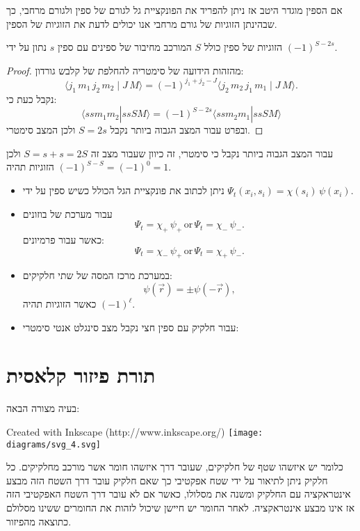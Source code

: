 \documentclass{tstextbook}
\begin{document}
\begin{proposition}
אם הספין מוגדר היטב אז ניתן להפריד את הפונקציית גל לגורם של ספין ולגורם מרחבי, כך שבהינתן הזוגיות של גורם מרחבי אנו יכולים לדעת את הזוגיות של הספין.

\end{proposition}
\begin{proposition}
הזוגיות של ספין כולל \(S\) המורכב מחיבור של ספינים עם ספין \(s\) נתון על ידי \((-1)^{S-2s}\).

\end{proposition}
\begin{proof}
מהזהות הידועה של סימטריה להחלפת של קלבש גורדון:
$$\langle j_{1}\,m_{1}\,j_{2}\,m_{2}\mid J\,M\rangle=(-1)^{j_{1}+j_{2}-J}\langle j_{2}\,m_{2}\,j_{1}\,m_{1}\mid J\,M\rangle.$$
נקבל כעת כי:
$$\langle ssm_{1}m_{2}|ssSM \rangle =(-1)^{S-2s}\langle ssm_{2}m_{1}|ssSM \rangle $$
ובפרט עבור המצב הגבוה ביותר נקבל \(S=2s\) ולכן המצב סימטרי.

\end{proof}
\begin{corollary}
עבור המצב הגבוה ביותר נקבל כי סימטרי, זה כיוון שעבור מצב זה \(S=s+s=2S\) ולכן הזוגיות תהיה \((-1)^{S-S}=(-1)^{0}=1\).

\end{corollary}
\begin{summary}
  \begin{itemize}
    \item ניתן לכתוב את פונקציית הגל הכולל כשיש ספין על ידי \(\Psi_{t}(x_{i},s_{i})=\chi(s_{i})\,\psi(x_{i})\).
    \item עבור מערכת של בוזונים $$\Psi_{t}=\chi_{+}\,\psi_{+}\,\mathrm{or}\,\Psi_{t}=\chi_{-}\,\psi_{-}.$$
כאשר עבור פרמיונים:
$$\Psi_{t}=\chi_{-}\,\psi_{+}\,\mathrm{or}\,\Psi_{t}=\chi_{+}\,\psi_{-}.$$
    \item במערכת מרכז המסה של שתי חלקיקים:
$$\psi({\vec{r}})=\pm\psi(-{\vec{r}}),$$
כאשר הזוגיות תהיה \((-1)^{\ell}\).
    \item עבור חלקיק עם ספין חצי נקבל מצב סינגלט אנטי סימטרי:
  \end{itemize}
\end{summary}

\section{תורת פיזור קלאסית}

\begin{definition}
בעיה מצורה הבאה:

 Created with Inkscape (http://www.inkscape.org/) \texttt{[image: diagrams/svg\_4.svg]}
\end{definition}
כלומר יש איזשהו שטף של חלקיקים, שעובר דרך איזשהו חומר אשר מורכב מחלקיקים. כל חלקיק ניתן לתיאור על ידי שטח אפקטיבי כך שאם חלקיק עובר דרך השטח הזה מבצע אינטראקציה עם החלקיק ומשנה את מסלולו, כאשר אם לא עובר דרך השטח האפקטיבי הזה אז אינו מבצע אינטראקציה. לאחר החומר יש חיישן שיכול לזהות את החומרים ששינו מסלולם כתוצאה מהפיזור.
\end{document}
